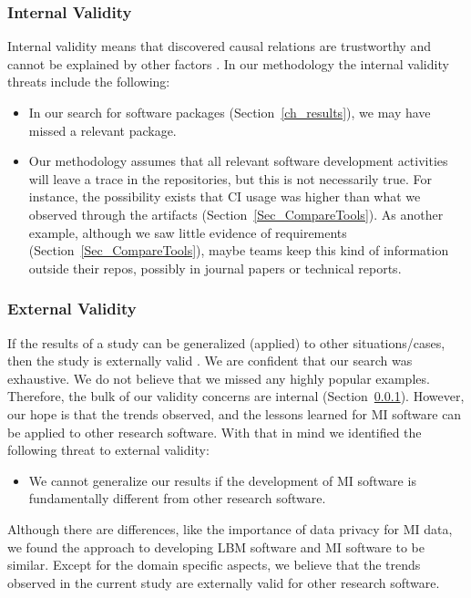 \documentclass[11pt]{article}
\begin{document}
\subsubsection{Internal Validity} \label{Sec_InternalValidity}

Internal validity means that discovered causal relations are trustworthy and
cannot be explained by other factors \cite{RunesonAndHost2009}. In our
methodology the internal validity threats include the following:

\begin{itemize}
\item In our search for software packages (Section~\ref{ch_results}), we may
have missed a relevant package.
\item Our methodology assumes that all relevant software development activities
will leave a trace in the repositories, but this is not necessarily true. For
instance, the possibility exists that CI usage was higher than what we observed
through the artifacts (Section~\ref{Sec_CompareTools}). As another example,
although we saw little evidence of requirements
(Section~\ref{Sec_CompareTools}), maybe teams keep this kind of information
outside their repos, possibly in journal papers or technical reports.
\end{itemize}

\subsubsection{External Validity}

If the results of a study can be generalized (applied) to other
situations/cases, then the study is externally valid \cite{RunesonAndHost2009}.
We are confident that our search was exhaustive.  We do not believe that we
missed any highly popular examples.  Therefore, the bulk of our validity
concerns are internal (Section~\ref{Sec_InternalValidity}).
However, our hope is that the trends observed, and the lessons learned for MI
software can be applied to other research software.  With that in mind we
identified the following threat to external validity:

\begin{itemize}
\item We cannot generalize our results if the development of MI software is
fundamentally different from other research software.
\end{itemize}

Although there are differences, like the importance of data privacy for MI data,
we found the approach to developing LBM software \cite{SmithEtAl2024} and MI
software to be similar.  Except for the domain specific aspects, we believe that
the trends observed in the current study are externally valid for other research
software.
\end{document}
